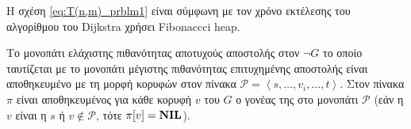 Η σχέση \eqref{eq:T(n,m)_prblm1} είναι σύμφωνη με τον χρόνο εκτέλεσης του αλγορίθμου του Dijkstra χρήσει Fibonaccci heap. 

Το μονοπάτι ελάχιστης πιθανότητας αποτυχούς αποστολής στον $\lnot G$ το οποίο ταυτίζεται με το μονοπάτι μέγιστης πιθανότητας επιτυχημένης αποστολής είναι αποθηκευμένο με τη μορφή κορυφών στον πίνακα $\mathcal{P}=\left\langle s,\ldots,v_i,\ldots,t\right\rangle$. Στον πίνακα $\pi$ είναι αποθηκευμένος για κάθε κορυφή $v$ του $G$ ο γονέας της στο μονοπάτι $\mathcal{P}$ (εάν η $v$ είναι η $s$ ή $v\notin\mathcal{P}$, τότε $\pi[v]={\textbf{NIL}}$).